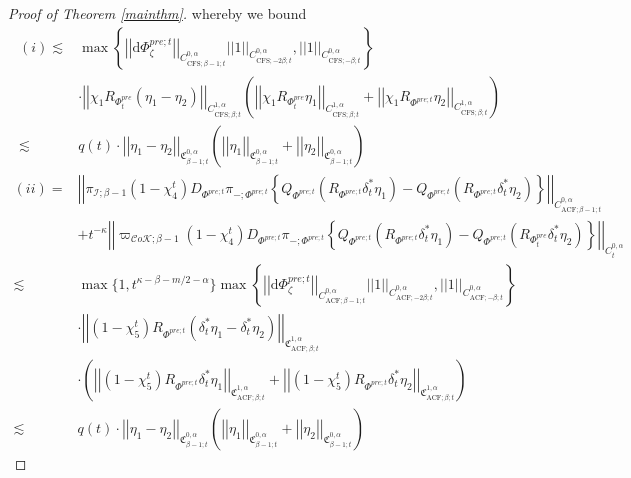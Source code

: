 \documentclass[psamsfonts]{amsart}
\theoremstyle{plain}
\theoremstyle{definition}{
\newtheorem{defi}{Definition}[section]
\newtheorem{ass}{Assumption}
\newtheorem*{nota}{Notation}}
\theoremstyle{remark}{
\newtheorem{rem}{Remark}
\newtheorem{ex}{Example}}
\theoremstyle{plain}{
\newtheorem{thm}{Theorem}[section]
\newtheorem{lem}{Lemma}[section]
\newtheorem{cor}{Corollary}[section]
\newtheorem{prop}{Proposition}[section]
\newtheorem{con}{Conjecture}[section]}
\newcommand{\m}[1]{{\mathrm{#1}}}
\begin{document}
\begin{proof}[Proof of Theorem \ref{mainthm}]
whereby we bound
\begin{align*}
    (i)\lesssim& \max\left\{\left|\left|\m{d}\Phi^{pre;t}_\zeta\right|\right|_{C^{0,\alpha}_{\m{CFS};\beta-1;t}}\left|\left|1\right|\right|_{C^{0,\alpha}_{\m{CFS};-2\beta;t}},\left|\left|1\right|\right|_{C^{0,\alpha}_{\m{CFS};-\beta;t}}\right\}\\
    &\cdot\left|\left|\chi_1R_{\Phi^{pre}_{t}}(\eta_1-\eta_2)\right|\right|_{C^{1,\alpha}_{\m{CFS};\beta;t}}\left(\left|\left|\chi_1R_{\Phi^{pre}_{t}}\eta_1\right|\right|_{C^{1,\alpha}_{\m{CFS};\beta;t}}+\left|\left|\chi_1R_{\Phi^{pre;t}}\eta_2\right|\right|_{C^{1,\alpha}_{\m{CFS};\beta;t}}\right)\\
    \lesssim&q(t)\cdot\left|\left|\eta_1-\eta_2\right|\right|_{\mathfrak{C}^{0,\alpha}_{\beta-1;t}}\left(\left|\left|\eta_1\right|\right|_{\mathfrak{C}^{0,\alpha}_{\beta-1;t}}+\left|\left|\eta_2\right|\right|_{\mathfrak{C}^{0,\alpha}_{\beta-1;t}}\right)
\end{align*}
\begin{align*}
    (ii)=&\left|\left|\pi_{\mathcal{I};\beta-1}(1-\chi^t_4)D_{\Phi^{pre;t}}\pi_{-;\Phi^{pre;t}}\left\{Q_{\Phi^{pre;t}}(R_{\Phi^{pre;t}}\delta_t^*\eta_1)-Q_{\Phi^{pre;t}}(R_{\Phi^{pre;t}}\delta_t^*\eta_2)\right\}\right|\right|_{C^{0,\alpha}_{\m{ACF};\beta-1;t}}\\
    &+t^{-\kappa}\left|\left|\varpi_{\mathcal{C}o\mathcal{K};\beta-1}(1-\chi^t_4)D_{\Phi^{pre;t}}\pi_{-;\Phi^{pre;t}}\left\{Q_{\Phi^{pre;t}}(R_{\Phi^{pre;t}}\delta_t^*\eta_1)-Q_{\Phi^{pre;t}}(R_{\Phi^{pre}_{t}}\delta_t^*\eta_2)\right\}\right|\right|_{C^{0,\alpha}_{t}}\\
    \lesssim&\max\{1,t^{\kappa-\beta-m/2-\alpha}\}\max\left\{\left|\left|\m{d}\Phi^{pre;t}_\zeta\right|\right|_{C^{0,\alpha}_{\m{ACF};\beta-1;t}}\left|\left|1\right|\right|_{C^{0,\alpha}_{\m{ACF};-2\beta;t}},\left|\left|1\right|\right|_{C^{0,\alpha}_{\m{ACF};-\beta;t}}\right\}\\
    &\cdot\left|\left|(1-\chi^t_5)R_{\Phi^{pre;t}}(\delta_t^*\eta_1-\delta_t^*\eta_2)\right|\right|_{\mathfrak{C}^{1,\alpha}_{\m{ACF};\beta;t}}\\
    &\cdot\left(\left|\left|(1-\chi^t_5)R_{\Phi^{pre;t}}\delta_t^*\eta_1\right|\right|_{\mathfrak{C}^{1,\alpha}_{\m{ACF};\beta;t}}+\left|\left|(1-\chi^t_5)R_{\Phi^{pre;t}}\delta_t^*\eta_2\right|\right|_{\mathfrak{C}^{1,\alpha}_{\m{ACF};\beta;t}}\right)\\
    \lesssim&q(t)\cdot\left|\left|\eta_1-\eta_2\right|\right|_{\mathfrak{C}^{0,\alpha}_{\beta-1;t}}\left(\left|\left|\eta_1\right|\right|_{\mathfrak{C}^{0,\alpha}_{\beta-1;t}}+\left|\left|\eta_2\right|\right|_{\mathfrak{C}^{0,\alpha}_{\beta-1;t}}\right)
\end{align*}


\end{proof}
\end{document}
